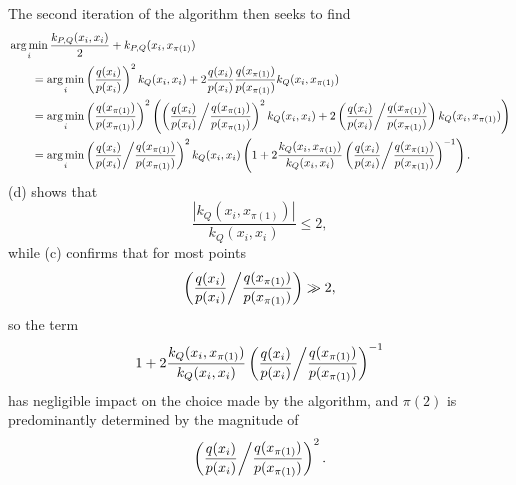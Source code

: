 \documentclass[11pt,a4paper]{report}
\DeclareMathOperator*{\argmin}{arg\,min}
\begin{document}
The second iteration of the algorithm then seeks to find
\begin{equation*}
\begin{aligned}
&\argmin_i \frac{k_{P,Q}(x_i, x_i)}{2} + k_{P,Q}(x_i, x_{\pi(1)}) \\
&\qquad = \argmin_i \left(\frac{q(x_i)}{p(x_i)}\right)^2 k_Q(x_i, x_i) + 2 \frac{q(x_i)}{p(x_i)} \frac{q(x_{\pi(1)})}{p(x_{\pi(1)})} k_Q(x_i, x_{\pi(1)}) \\
&\qquad = \argmin_i \left(\frac{q(x_{\pi(1)})}{p(x_{\pi(1)})}\right)^2 \left( \left(\frac{q(x_i)}{p(x_i)} \middle/ \frac{q(x_{\pi(1)})}{p(x_{\pi(1)})}\right)^2 k_Q(x_i, x_i) + 2 \left(\frac{q(x_i)}{p(x_i)} \middle/ \frac{q(x_{\pi(1)})}{p(x_{\pi(1)})}\right) k_Q(x_i, x_{\pi(1)}) \right) \\
&\qquad = \argmin_i \left(\frac{q(x_i)}{p(x_i)} \middle/ \frac{q(x_{\pi(1)})}{p(x_{\pi(1)})}\right)^2 k_Q(x_i, x_i) \left( 1 + 2 \frac{k_Q(x_i, x_{\pi(1)})}{k_Q(x_i, x_i)} \left(\frac{q(x_i)}{p(x_i)} \middle/ \frac{q(x_{\pi(1)})}{p(x_{\pi(1)})}\right)^{-1} \right).
\end{aligned}
\end{equation*}
(d) shows that
\begin{equation*}
\frac{|k_Q(x_i, x_{\pi(1)})|}{k_Q(x_i, x_i)} \leq 2,
\end{equation*}
while (c) confirms that for most points
\begin{equation*}
\left(\frac{q(x_i)}{p(x_i)} \middle/ \frac{q(x_{\pi(1)})}{p(x_{\pi(1)})}\right) \gg 2,
\end{equation*}
so the term
\begin{equation*}
1 + 2 \frac{k_Q(x_i, x_{\pi(1)})}{k_Q(x_i, x_i)} \left(\frac{q(x_i)}{p(x_i)} \middle/ \frac{q(x_{\pi(1)})}{p(x_{\pi(1)})}\right)^{-1}
\end{equation*}
has negligible impact on the choice made by the algorithm, and $\pi(2)$ is predominantly determined by the magnitude of
\begin{equation*}
\left(\frac{q(x_i)}{p(x_i)} \middle/ \frac{q(x_{\pi(1)})}{p(x_{\pi(1)})}\right)^2.
\end{equation*}
\end{document}
